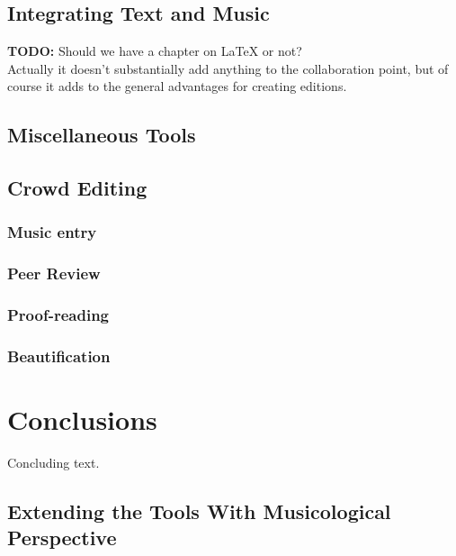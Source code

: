\documentclass[11pt,a4paper]{article}
\begin{document}
\subsection{Integrating Text and Music}
\textbf{TODO:} Should we have a chapter on LaTeX or not?\\
Actually it doesn't substantially add anything to the collaboration point,
but of course it adds to the general advantages for creating editions.

\subsection{Miscellaneous Tools}


\subsection{Crowd Editing}

\subsubsection{Music entry}

\subsubsection{Peer Review}

\subsubsection{Proof-reading}

\subsubsection{Beautification}


\section{Conclusions}\label{sec:conclusions}

Concluding text.


\subsection{Extending the Tools With Musicological Perspective}
\end{document}
